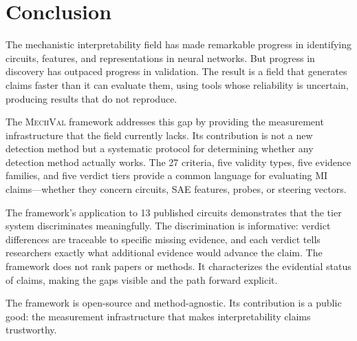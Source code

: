 \documentclass[10pt]{article}
\newcommand{\mechval}{\textsc{MechVal}}
\begin{document}
\section{Conclusion}
\label{sec:conclusion}

The mechanistic interpretability field has made remarkable progress in identifying circuits, features, and representations in neural networks. But progress in discovery has outpaced progress in validation. The result is a field that generates claims faster than it can evaluate them, using tools whose reliability is uncertain, producing results that do not reproduce.

The \mechval{} framework addresses this gap by providing the measurement infrastructure that the field currently lacks. Its contribution is not a new detection method but a systematic protocol for determining whether any detection method actually works. The 27 criteria, five validity types, five evidence families, and five verdict tiers provide a common language for evaluating MI claims---whether they concern circuits, SAE features, probes, or steering vectors.

The framework's application to 13 published circuits demonstrates that the tier system discriminates meaningfully. The discrimination is informative: verdict differences are traceable to specific missing evidence, and each verdict tells researchers exactly what additional evidence would advance the claim. The framework does not rank papers or methods. It characterizes the evidential status of claims, making the gaps visible and the path forward explicit.

The framework is open-source and method-agnostic. Its contribution is a public good: the measurement infrastructure that makes interpretability claims trustworthy.

% 
% 

\end{document}
